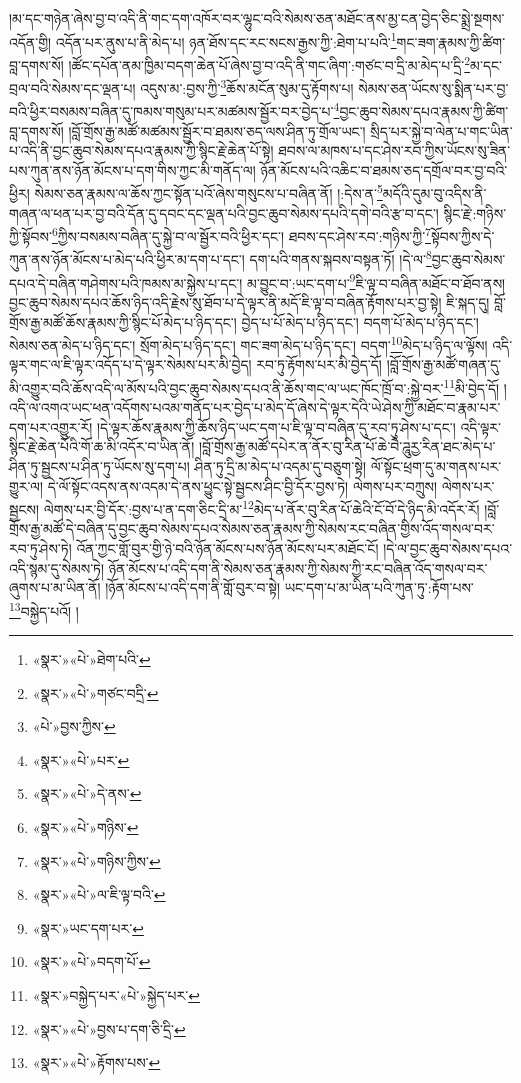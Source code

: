 །མ་དང་གཉེན་ཞེས་བྱ་བ་འདི་ནི་གང་དག་འཁོར་བར་ལྷུང་བའི་སེམས་ཅན་མཐོང་ནས་མྱ་ངན་བྱེད་ཅིང་སྨྲེ་སྔགས་འདོན་གྱི། འདོན་པར་ནུས་པ་ནི་མེད་པ། ཉན་ཐོས་དང་རང་སངས་རྒྱས་ཀྱི་:ཐེག་པ་པའི་\footnote{«སྣར་»«པེ་»ཐེག་པའི་}གང་ཟག་རྣམས་ཀྱི་ཚིག་བླ་དགས་སོ། །ཚོང་དཔོན་ནམ་ཁྱིམ་བདག་ཆེན་པོ་ཞེས་བྱ་བ་འདི་ནི་གང་ཞིག་:གཙང་བ་དྲི་མ་མེད་པ་དྲི་\footnote{«སྣར་»«པེ་»གཙང་བདྲི་}མ་དང་བྲལ་བའི་སེམས་དང་ལྡན་པ། འདུས་མ་:བྱས་ཀྱི་\footnote{«པེ་»བྱས་ཀྱིས་}ཆོས་མངོན་སུམ་དུ་རྟོགས་པ། སེམས་ཅན་ཡོངས་སུ་སྨིན་པར་བྱ་བའི་ཕྱིར་བསམས་བཞིན་དུ་ཁམས་གསུམ་པར་མཚམས་སྦྱོར་བར་བྱེད་པ་\footnote{«སྣར་»«པེ་»པར་}བྱང་ཆུབ་སེམས་དཔའ་རྣམས་ཀྱི་ཚིག་བླ་དགས་སོ། །བློ་གྲོས་རྒྱ་མཚོ་མཚམས་སྦྱོར་བ་ཐམས་ཅད་ལས་ཤིན་ཏུ་གྲོལ་ཡང་། སྲིད་པར་སྐྱེ་བ་ལེན་པ་གང་ཡིན་པ་འདི་ནི་བྱང་ཆུབ་སེམས་དཔའ་རྣམས་ཀྱི་སྙིང་རྗེ་ཆེན་པོ་སྟེ། ཐབས་ལ་མཁས་པ་དང་ཤེས་རབ་ཀྱིས་ཡོངས་སུ་ཟིན་པས་ཀུན་ནས་ཉོན་མོངས་པ་དག་གིས་ཀྱང་མི་གནོད་ལ། ཉོན་མོངས་པའི་འཆིང་བ་ཐམས་ཅད་དགྲོལ་བར་བྱ་བའི་ཕྱིར། སེམས་ཅན་རྣམས་ལ་ཆོས་ཀྱང་སྟོན་པའོ་ཞེས་གསུངས་པ་བཞིན་ནོ། །:དེས་ན་\footnote{«སྣར་»«པེ་»དེ་ནས་}མདོའི་དུམ་བུ་འདིས་ནི་གཞན་ལ་ཕན་པར་བྱ་བའི་དོན་དུ་དབང་དང་ལྡན་པའི་བྱང་ཆུབ་སེམས་དཔའི་དགེ་བའི་རྩ་བ་དང་། སྙིང་རྗེ་:གཉིས་ཀྱི་སྟོབས་\footnote{«སྣར་»«པེ་»གཉིས་}ཀྱིས་བསམས་བཞིན་དུ་སྐྱེ་བ་ལ་སྦྱོར་བའི་ཕྱིར་དང་། ཐབས་དང་ཤེས་རབ་:གཉིས་ཀྱི་\footnote{«སྣར་»«པེ་»གཉིས་ཀྱིས་}སྟོབས་ཀྱིས་དེ་ཀུན་ནས་ཉོན་མོངས་པ་མེད་པའི་ཕྱིར་མ་དག་པ་དང་། དག་པའི་གནས་སྐབས་བསྟན་ཏོ། །དེ་ལ་\footnote{«སྣར་»«པེ་»ལ་ཇི་ལྟ་བའི་}བྱང་ཆུབ་སེམས་དཔའ་དེ་བཞིན་གཤེགས་པའི་ཁམས་མ་སྐྱེས་པ་དང་། མ་བྱུང་བ་:ཡང་དག་པ་\footnote{«སྣར་»ཡང་དག་པར་}ཇི་ལྟ་བ་བཞིན་མཐོང་བ་ཐོབ་ནས། བྱང་ཆུབ་སེམས་དཔའ་ཆོས་ཉིད་འདི་རྗེས་སུ་ཐོབ་པ་དེ་ལྟར་ནི་མདོ་ཇི་ལྟ་བ་བཞིན་རྟོགས་པར་བྱ་སྟེ། ཇི་སྐད་དུ། བློ་གྲོས་རྒྱ་མཚོ་ཆོས་རྣམས་ཀྱི་སྙིང་པོ་མེད་པ་ཉིད་དང་། བྱེད་པ་པོ་མེད་པ་ཉིད་དང་། བདག་པོ་མེད་པ་ཉིད་དང་། སེམས་ཅན་མེད་པ་ཉིད་དང་། སྲོག་མེད་པ་ཉིད་དང་། གང་ཟག་མེད་པ་ཉིད་དང་། བདག་\footnote{«སྣར་»«པེ་»བདག་པོ་}མེད་པ་ཉིད་ལ་ལྟོས། འདི་ལྟར་གང་ལ་ཇི་ལྟར་འདོད་པ་དེ་ལྟར་སེམས་པར་མི་བྱེད། རབ་ཏུ་རྟོགས་པར་མི་བྱེད་དོ། །བློ་གྲོས་རྒྱ་མཚོ་གཞན་དུ་མི་འགྱུར་བའི་ཆོས་འདི་ལ་མོས་པའི་བྱང་ཆུབ་སེམས་དཔའ་ནི་ཆོས་གང་ལ་ཡང་ཁོང་ཁྲོ་བ་:སྐྱེ་བར་\footnote{«སྣར་»བསྐྱེད་པར་«པེ་»སྐྱེད་པར་}མི་བྱེད་དོ། །འདི་ལ་འགའ་ཡང་ཕན་འདོགས་པའམ་གནོད་པར་བྱེད་པ་མེད་དོ་ཞེས་དེ་ལྟར་དེའི་ཡེ་ཤེས་ཀྱི་མཐོང་བ་རྣམ་པར་དག་པར་འགྱུར་རོ། །དེ་ལྟར་ཆོས་རྣམས་ཀྱི་ཆོས་ཉིད་ཡང་དག་པ་ཇི་ལྟ་བ་བཞིན་དུ་རབ་ཏུ་ཤེས་པ་དང་། འདི་ལྟར་སྙིང་རྗེ་ཆེན་པོའི་གོ་ཆ་མི་འདོར་བ་ཡིན་ནོ། །བློ་གྲོས་རྒྱ་མཚོ་དཔེར་ན་ནོར་བུ་རིན་པོ་ཆེ་བཻ་ཌཱུརྱ་རིན་ཐང་མེད་པ་ཤིན་ཏུ་སྦྱངས་པ་ཤིན་ཏུ་ཡོངས་སུ་དག་པ། ཤིན་ཏུ་དྲི་མ་མེད་པ་འདམ་དུ་བཅུག་སྟེ། ལོ་སྟོང་ཕྲག་དུ་མ་གནས་པར་གྱུར་ལ། དེ་ལོ་སྟོང་འདས་ནས་འདམ་དེ་ནས་ཕྱུང་སྟེ་སྦྱངས་ཤིང་བྱི་དོར་བྱས་ཏེ། ལེགས་པར་བཀྲུས། ལེགས་པར་སྦྱངས། ལེགས་པར་བྱི་དོར་:བྱས་པ་ན་དག་ཅིང་དྲི་མ་\footnote{«སྣར་»«པེ་»བྱས་པ་དག་ཅི་དྲི་}མེད་པ་ནོར་བུ་རིན་པོ་ཆེའི་ངོ་བོ་དེ་ཉིད་མི་འདོར་རོ། །བློ་གྲོས་རྒྱ་མཚོ་དེ་བཞིན་དུ་བྱང་ཆུབ་སེམས་དཔའ་སེམས་ཅན་རྣམས་ཀྱི་སེམས་རང་བཞིན་གྱིས་འོད་གསལ་བར་རབ་ཏུ་ཤེས་ཏེ། འོན་ཀྱང་གློ་བུར་གྱི་ཉེ་བའི་ཉོན་མོངས་པས་ཉོན་མོངས་པར་མཐོང་ངོ། །དེ་ལ་བྱང་ཆུབ་སེམས་དཔའ་འདི་སྙམ་དུ་སེམས་ཏེ། ཉོན་མོངས་པ་འདི་དག་ནི་སེམས་ཅན་རྣམས་ཀྱི་སེམས་ཀྱི་རང་བཞིན་འོད་གསལ་བར་ཞུགས་པ་མ་ཡིན་ནོ། །ཉོན་མོངས་པ་འདི་དག་ནི་གློ་བུར་བ་སྟེ། ཡང་དག་པ་མ་ཡིན་པའི་ཀུན་ཏུ་:རྟོག་པས་\footnote{«སྣར་»«པེ་»རྟོགས་པས་}བསྐྱེད་པའོ། །
